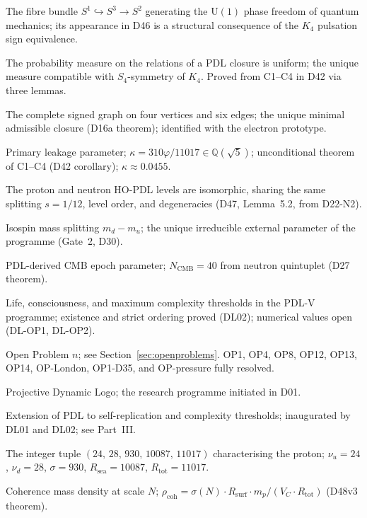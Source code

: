 \documentclass[11pt,a4paper]{article}
\theoremstyle{plain}
\theoremstyle{definition}
\theoremstyle{remark}
\newcommand{\quintuplet}{(24,\,28,\,930,\,10087,\,11017)}
\newcommand{\Rsurf}{R_{\mathrm{surf}}}
\newcommand{\Rtot}{R_{\mathrm{tot}}}
\newcommand{\sigmaN}{\sigma(N)}
\newcommand{\rhocoh}{\rho_{\mathrm{coh}}}
\begin{document}
\begin{description}[leftmargin=3.5cm, style=nextline]
\item[Hopf fibration] The fibre bundle $S^1\hookrightarrow S^3\to S^2$ generating the $\mathrm{U}(1)$ phase freedom of quantum mechanics; its appearance in D46 is a structural consequence of the $K_4$ pulsation sign equivalence.
\item[Indifference Lemma (H3)] The probability measure on the relations of a PDL closure is uniform; the unique measure compatible with $S_4$-symmetry of $K_4$. Proved from C1--C4 in D42 via three lemmas.
\item[$K_4$] The complete signed graph on four vertices and six edges; the unique minimal admissible closure (D16a theorem); identified with the electron prototype.
\item[$\kappa$] Primary leakage parameter; $\kappa=310\varphi/11017\in\mathbb{Q}(\sqrt{5})$; unconditional theorem of C1--C4 (D42 corollary); $\kappa\approx 0.0455$.
\item[Mirror Lemma] The proton and neutron HO-PDL levels are isomorphic, sharing the same splitting $s=1/12$, level order, and degeneracies (D47, Lemma~5.2, from D22-N2).
\item[$m_{\mathrm{iso}}$] Isospin mass splitting $m_d-m_u$; the unique irreducible external parameter of the programme (Gate~2, D30).
\item[$N_{\mathrm{CMB}}$] PDL-derived CMB epoch parameter; $N_{\mathrm{CMB}}=40$ from neutron quintuplet (D27 theorem).
\item[$n^*_{\mathrm{life}}$, $n^*_{\mathrm{consciousness}}$, $n^*_{\mathrm{max}}$] Life, consciousness, and maximum complexity thresholds in the PDL-V programme; existence and strict ordering proved (DL02); numerical values open (DL-OP1, DL-OP2).
\item[OP$n$] Open Problem $n$; see Section~\ref{sec:openproblems}. OP1, OP4, OP8, OP12, OP13, OP14, OP-London, OP1-D35, and OP-pressure fully resolved.
\item[PDL] Projective Dynamic Logo; the research programme initiated in D01.
\item[PDL-V programme] Extension of PDL to self-replication and complexity thresholds; inaugurated by DL01 and DL02; see Part~III.
\item[Quintuplet] The integer tuple $\quintuplet$ characterising the proton; $\nu_u=24$, $\nu_d=28$, $\sigma=930$, $R_{\mathrm{sea}}=10087$, $R_{\mathrm{tot}}=11017$.
\item[$\rhocoh(N)$] Coherence mass density at scale $N$; $\rhocoh = \sigmaN\cdot\Rsurf\cdot m_p/(V_C\cdot\Rtot)$ (D48v3 theorem).

\end{description}
\end{document}
